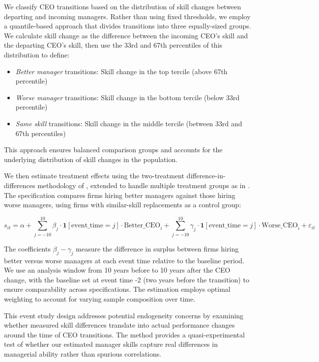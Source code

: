 \documentclass[11pt,a4paper]{article}
\begin{document}
We classify CEO transitions based on the distribution of skill changes between departing and incoming managers. Rather than using fixed thresholds, we employ a quantile-based approach that divides transitions into three equally-sized groups. We calculate skill change as the difference between the incoming CEO's skill and the departing CEO's skill, then use the 33rd and 67th percentiles of this distribution to define:
\begin{itemize}
\item \textit{Better manager} transitions: Skill change in the top tercile (above 67th percentile)
\item \textit{Worse manager} transitions: Skill change in the bottom tercile (below 33rd percentile)
\item \textit{Same skill} transitions: Skill change in the middle tercile (between 33rd and 67th percentiles)
\end{itemize}
This approach ensures balanced comparison groups and accounts for the underlying distribution of skill changes in the population.

We then estimate treatment effects using the two-treatment difference-in-differences methodology of \citet{Callaway2021JoLE}, extended to handle multiple treatment groups as in \citet{Koren2023expat}. The specification compares firms hiring better managers against those hiring worse managers, using firms with similar-skill replacements as a control group:

\begin{equation}
s_{it} = \alpha + \sum_{j=-10}^{10} \beta_j \cdot \mathbf{1}[\text{event\_time} = j] \cdot \text{Better\_CEO}_i + \sum_{j=-10}^{10} \gamma_j \cdot \mathbf{1}[\text{event\_time} = j] \cdot \text{Worse\_CEO}_i + \varepsilon_{it}
\end{equation}

The coefficients $\beta_j - \gamma_j$ measure the difference in surplus between firms hiring better versus worse managers at each event time relative to the baseline period. We use an analysis window from 10 years before to 10 years after the CEO change, with the baseline set at event time -2 (two years before the transition) to ensure comparability across specifications. The estimation employs optimal weighting to account for varying sample composition over time.

This event study design addresses potential endogeneity concerns by examining whether measured skill differences translate into actual performance changes around the time of CEO transitions. The method provides a quasi-experimental test of whether our estimated manager skills capture real differences in managerial ability rather than spurious correlations.
\end{document}
